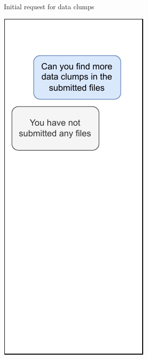 \begin{figure}
\begin{adjustbox}{minipage=\linewidth,scale=0.7}
\begin{subfigure}[b]{0.3\textwidth}
         \caption{Initial request for data clumps}
        \label{fig:llm_stateless1}
     \end{subfigure}
     \hfill
     \begin{subfigure}[b]{0.30\textwidth}
         \centering
         \includegraphics[width=\textwidth]{figures/chapter2/chatgpt_stateless_2.drawio.pdf}

\end{subfigure}
\end{adjustbox}
\end{figure}
